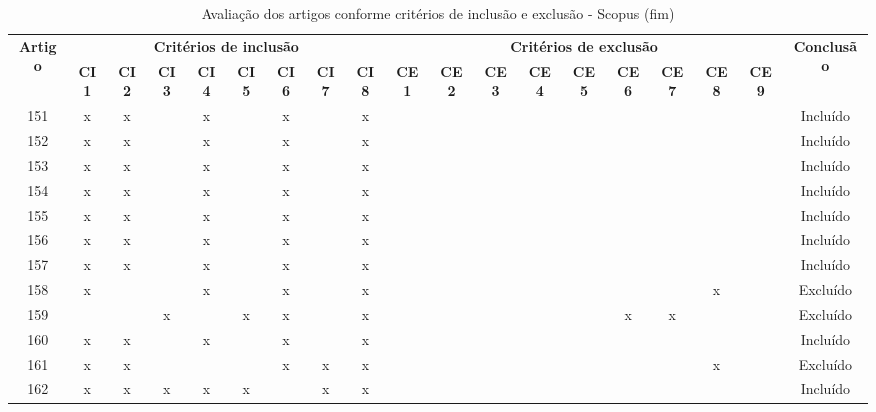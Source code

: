 \documentclass[
	12pt,				%
	oneside,			%
	a4paper,			%
	english,			%
	brazil				%
	]{abntex2ppgsi}
\begin{document}
\begin{apendicesenv}
\begin{table}[H]
\centering
\caption{Avaliação dos artigos conforme critérios de inclusão e exclusão - Scopus (fim)}
\label{tab:critincluexclu_fim} 
\setlength{\tabcolsep}{1.5pt} %
\footnotesize %
\begin{tabular}{c | c c c c c c c c | c c c c c c c c c | c}
\toprule
    \multirow{2}{*}{\textbf{Artigo}} & 
    \multicolumn{8}{c|}{\textbf{Critérios de inclusão}} &
    \multicolumn{9}{c|}{\textbf{Critérios de exclusão}} &
    \multirow{2}{*}{\textbf{Conclusão}} \\ 
    \cline{2-18}
 & \tiny\textbf{CI1} & \tiny\textbf{CI2} & \tiny\textbf{CI3} & \tiny\textbf{CI4} & \tiny\textbf{CI5} & \tiny\textbf{CI6} & \tiny\textbf{CI7} & \tiny\textbf{CI8} & \tiny\textbf{CE1} & \tiny\textbf{CE2} & \tiny\textbf{CE3} & \tiny\textbf{CE4} & \tiny\textbf{CE5} & \tiny\textbf{CE6} & \tiny\textbf{CE7} & \tiny\textbf{CE8} & \tiny\textbf{CE9} & \\
\midrule
151 & x & x &   & x &   & x &   & x &   &   &   &   &   &   &   &   &   & Incluído \\
152 & x & x &   & x &   & x &   & x &   &   &   &   &   &   &   &   &   & Incluído \\
153 & x & x &   & x &   & x &   & x &   &   &   &   &   &   &   &   &   & Incluído \\
154 & x & x &   & x &   & x &   & x &   &   &   &   &   &   &   &   &   & Incluído \\
155 & x & x &   & x &   & x &   & x &   &   &   &   &   &   &   &   &   & Incluído \\
156 & x & x &   & x &   & x &   & x &   &   &   &   &   &   &   &   &   & Incluído \\
157 & x & x &   & x &   & x &   & x &   &   &   &   &   &   &   &   &   & Incluído \\
158 & x &   &   & x &   & x &   & x &   &   &   &   &   &   &   & x &   & Excluído \\
159 &   &   & x &   & x & x &   & x &   &   &   &   &   & x & x &   &   & Excluído \\
160 & x & x &   & x &   & x &   & x &   &   &   &   &   &   &   &   &   & Incluído \\
161 & x & x &   &   &   & x & x & x &   &   &   &   &   &   &   & x &   & Excluído \\
162 & x & x & x & x & x &   & x & x &   &   &   &   &   &   &   &   &   & Incluído \\

\end{tabular}
\end{table}
\end{apendicesenv}
\end{document}
